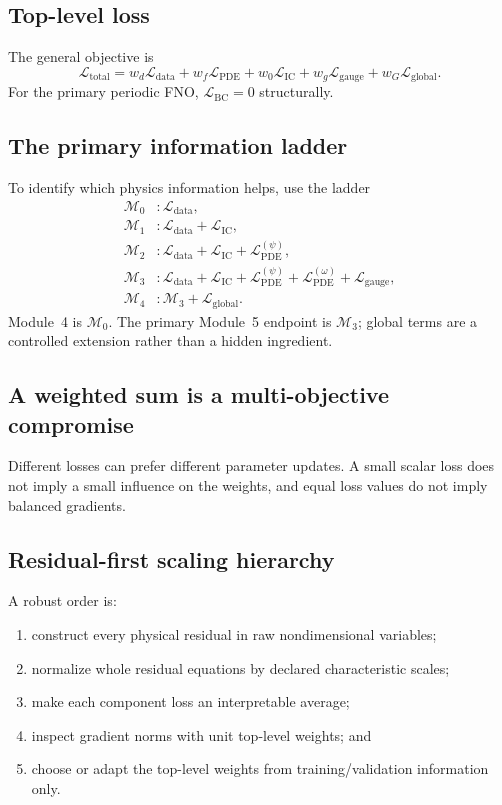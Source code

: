 \documentclass[11pt]{article}
\newcommand{\Ldata}{\mathcal{L}_{\mathrm{data}}}
\newcommand{\Lpde}{\mathcal{L}_{\mathrm{PDE}}}
\newcommand{\Lic}{\mathcal{L}_{\mathrm{IC}}}
\newcommand{\Lbc}{\mathcal{L}_{\mathrm{BC}}}
\newcommand{\Lglobal}{\mathcal{L}_{\mathrm{global}}}
\newcommand{\Lgauge}{\mathcal{L}_{\mathrm{gauge}}}
\newcommand{\Ltotal}{\mathcal{L}_{\mathrm{total}}}
\begin{document}
\subsection{Top-level loss}
The general objective is
\begin{equation}
\boxed{
\Ltotal
=w_d\Ldata
+w_f\Lpde
+w_0\Lic
+w_g\Lgauge
+w_G\Lglobal.
}
\label{eq:total_loss}
\end{equation}
For the primary periodic FNO, $\Lbc=0$ structurally.

\subsection{The primary information ladder}
To identify which physics information helps, use the ladder
\begin{align*}
\mathcal{M}_0 &: \Ldata,\\
\mathcal{M}_1 &: \Ldata+\Lic,\\
\mathcal{M}_2 &: \Ldata+\Lic+\Lpde^{(\psi)},\\
\mathcal{M}_3 &: \Ldata+\Lic+\Lpde^{(\psi)}+\Lpde^{(\omega)}+\Lgauge,\\
\mathcal{M}_4 &: \mathcal{M}_3+\Lglobal.
\end{align*}
Module~4 is $\mathcal{M}_0$. The primary Module~5 endpoint is $\mathcal{M}_3$; global terms are a controlled extension rather than a hidden ingredient.

\subsection{A weighted sum is a multi-objective compromise}
Different losses can prefer different parameter updates. A small scalar loss does not imply a small influence on the weights, and equal loss values do not imply balanced gradients.

\subsection{Residual-first scaling hierarchy}
A robust order is:
\begin{enumerate}
  \item construct every physical residual in raw nondimensional variables;
  \item normalize whole residual equations by declared characteristic scales;
  \item make each component loss an interpretable average;
  \item inspect gradient norms with unit top-level weights; and
  \item choose or adapt the top-level weights from training/validation information only.
\end{enumerate}
\end{document}
